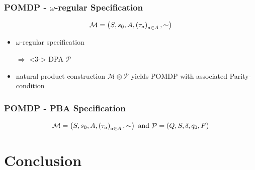 \documentclass{beamer}
\begin{document}
  \begin{frame}
    \frametitle{\ac{POMDP} - $\omega$-regular Specification}
    \begin{equation*}
      \mathcal{M} = \left(S, s_{0}, A, \left(\tau_{a}\right)_{a\in A}, \sim\right)
    \end{equation*}
    \begin{itemize}
      \item<2-> $\omega$-regular specification
      \item[$\Rightarrow$]<3-> \ac{DPA} $\mathcal{P}$
      \item<4-> natural product construction $\mathcal{M}\otimes\mathcal{P}$
        yields \ac{POMDP} with associated Parity-condition
    \end{itemize}
  \end{frame}

  \begin{frame}
    \frametitle{\ac{POMDP} - \ac{PBA} Specification}
    \begin{equation*}
      \mathcal{M} = \left(S, s_{0}, A, \left(\tau_{a}\right)_{a\in A}, \sim\right)
      \text{ and }
      \mathcal{P} = \left(Q, S, \delta, q_{0}, F\right)
    \end{equation*}
  \end{frame}

  \section{Conclusion}
  \begin{frame}
  \end{frame}
\end{document}
